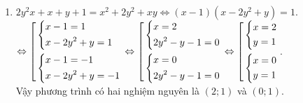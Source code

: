 \begin{ex}
{\begin{enumerate}
\begin{itemize}
	$B$ có giá trị nguyên khi $\dfrac{3}{x}\in\mathbb{Z}\Leftrightarrow x\in\text{Ư}(3)$ và $x>2\Leftrightarrow x=3$.
	\end{itemize}
	Tập các giá trị của $x$ để $B$ nguyên là $x\in\left\{\pm 1;\pm 3\right\}$.
	\item $2y^2x+x+y+1=x^2+2y^2+xy\Leftrightarrow (x-1)\left(x-2y^2+y\right)=1$.\\
	$\Leftrightarrow \left[\begin{aligned}&\left\{\begin{aligned}&x-1=1\\&x-2y^2+y=1\end{aligned}\right.\\&\left\{\begin{aligned}&x-1=-1\\&x-2y^2+y=-1\end{aligned}\right.\end{aligned}\right.\Leftrightarrow \left[\begin{aligned}&\left\{\begin{aligned}&x=2\\&2y^2-y-1=0\end{aligned}\right.\\&\left\{\begin{aligned}&x=0\\&2y^2-y-1=0\end{aligned}\right.\end{aligned}\right.\Leftrightarrow \left[\begin{aligned}&\left\{\begin{aligned}&x=2\\&y=1\end{aligned}\right.\\&\left\{\begin{aligned}&x=0\\&y=1\end{aligned}\right.\end{aligned}\right.$.\\
	Vậy phương trình có hai nghiệm nguyên là $(2;1)$ và $(0;1)$.
	\end{enumerate}		
	}
\end{ex}

